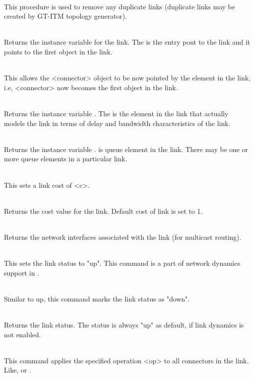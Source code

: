 \begin{flushleft}
\\
This procedure is used to remove any duplicate links (duplicate links may be
created by GT-ITM topology generator).


\\
Returns the instance variable  for the link. The  is
the entry pont to the link and it points to the first object in the link.


\\
This allows the <connector> object to be now pointed by the 
element in the link, i.e, <connector> now becomes the first object in the
link.


\\
Returns the instance variable . The  is the element
in the link that actually models the link in terms of delay and bandwidth
characteristics of the link.


\\
Returns the instance variable .  is queue element
in the link. There may be one or more queue elements in a particular link.


\\
This sets a link cost of <c>.


\\
Returns the cost value for the link. Default cost of link is set to 1.


\\
Returns the network interfaces associated with the link (for multicast routing).


\\
This sets the link status to "up". This command is a part of network
dynamics support in \ns.


\\
Similar to up, this command marks the link status as "down".


\\
Returns the link status. The status is always "up" as default, if link
dynamics is not enabled.


\\ 
This command applies the specified operation <op> to all connectors in the
link.  Like,  or . 



\end{flushleft}
